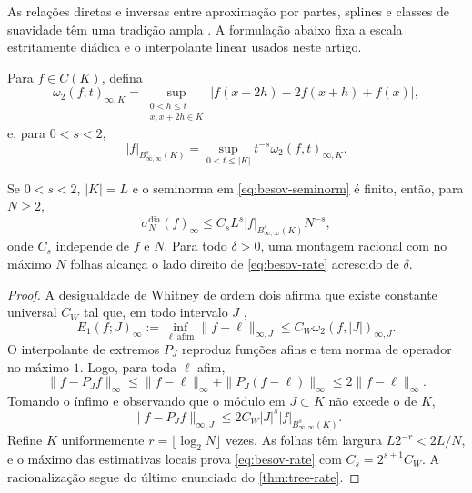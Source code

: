 As relações diretas e inversas entre aproximação por partes, splines e classes
de suavidade têm uma tradição ampla
\citep{birman1967,petrushev1988,devorepopov1988}. A formulação abaixo fixa a
escala estritamente diádica e o interpolante linear usados neste artigo.

Para $f\in C(K)$, defina
\begin{equation}
 \omega_2(f,t)_{\infty,K}
 =\sup_{\substack{0<h\le t\\x,x+2h\in K}}
 |f(x+2h)-2f(x+h)+f(x)|,
\end{equation}
e, para $0<s<2$,
\begin{equation}
 |f|_{B^s_{\infty,\infty}(K)}
 =\sup_{0<t\le|K|}t^{-s}\omega_2(f,t)_{\infty,K}.
 \label{eq:besov-seminorm}
\end{equation}

\begin{theorem}\label{thm:besov}
Se $0<s<2$, $|K|=L$ e o seminorma em \eqref{eq:besov-seminorm} é finito, então, para $N\ge2$,
\begin{equation}
 \sigma_N^{\mathrm{dia}}(f)_\infty
 \le C_sL^s|f|_{B^s_{\infty,\infty}(K)}N^{-s},
 \label{eq:besov-rate}
\end{equation}
onde $C_s$ independe de $f$ e $N$. Para todo $\delta>0$, uma montagem racional com no máximo $N$ folhas alcança o lado direito de \eqref{eq:besov-rate} acrescido de $\delta$.
\end{theorem}

\begin{proof}
A desigualdade de Whitney de ordem dois afirma que existe constante universal $C_W$ tal que, em todo intervalo $J$ \citep{whitney1957,devore1998},
\[
 E_1(f;J)_\infty:=\inf_{\ell\ \mathrm{afim}}\|f-\ell\|_{\infty,J}
 \le C_W\omega_2(f,|J|)_{\infty,J}.
\]
O interpolante de extremos $P_J$ reproduz funções afins e tem norma de operador no máximo $1$. Logo, para toda $\ell$ afim,
\[
 \|f-P_Jf\|_\infty
 \le\|f-\ell\|_\infty+\|P_J(f-\ell)\|_\infty
 \le2\|f-\ell\|_\infty.
\]
Tomando o ínfimo e observando que o módulo em $J\subset K$ não excede o de $K$,
\[
 \|f-P_Jf\|_{\infty,J}
 \le2C_W|J|^s|f|_{B^s_{\infty,\infty}(K)}.
\]
Refine $K$ uniformemente $r=\lfloor\log_2N\rfloor$ vezes. As folhas têm largura $L2^{-r}<2L/N$, e o máximo das estimativas locais prova \eqref{eq:besov-rate} com $C_s=2^{s+1}C_W$. A racionalização segue do último enunciado do \cref{thm:tree-rate}.
\end{proof}

